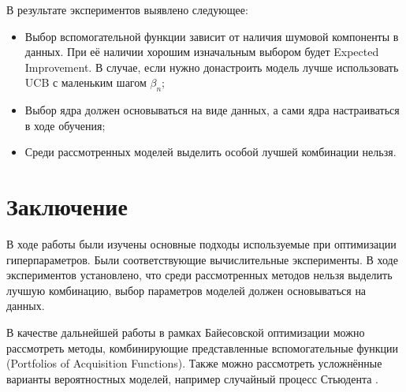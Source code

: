 \documentclass[12pt,fleqn]{article}
\begin{document}
	В результате экспериментов выявлено следующее:
	
	\begin{itemize}
		\item Выбор вспомогательной функции зависит от наличия шумовой компоненты в данных. При её наличии хорошим изначальным выбором будет Expected Improvement. В случае, если нужно донастроить модель лучше использовать UCB с маленьким шагом $\beta_n$;
		\item Выбор ядра должен основываться на виде данных, а сами ядра настраиваться в ходе обучения;
		\item Среди рассмотренных моделей выделить особой лучшей комбинации нельзя.
	\end{itemize}
	\newpage
\section{Заключение}

В ходе работы были изучены основные подходы используемые при оптимизации гиперпараметров. Были соответствующие вычислительные эксперименты. В ходе экспериментов установлено, что среди рассмотренных методов нельзя выделить лучшую комбинацию, выбор параметров моделей должен основываться на данных.

В качестве дальнейшей работы в рамках Байесовской оптимизации можно рассмотреть методы, комбинирующие представленные вспомогательные функции (Portfolios of Acquisition Functions). Также можно рассмотреть усложнённые варианты вероятностных моделей, например случайный процесс Стьюдента \cite{shah2014student}.

\newpage




\end{document}
